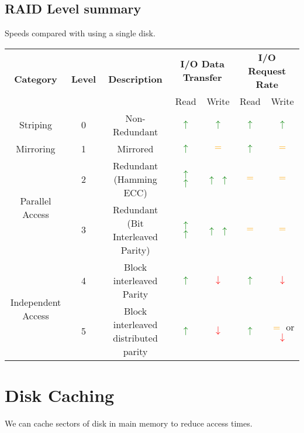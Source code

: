\documentclass{report}
\begin{document}
        \subsection*{RAID Level summary}
            Speeds compared with using a single disk.
            \begin{center}
                \begin{tabular}{c c c c c c c }
                    \multirow{2}{*}{\textbf{Category}} & \multirow{2}{*}{\textbf{Level}} & \multirow{2}{*}{\textbf{Description}} & \multicolumn{2}{c}{\textbf{I/O Data Transfer}} & \multicolumn{2}{c}{\textbf{I/O Request Rate}} \\
                    & & & Read & Write & Read & Write \\
                    \hline
                    Striping & 0 & Non-Redundant & \textcolor{green}{$\uparrow$} & \textcolor{green}{$\uparrow$} & \textcolor{green}{$\uparrow$} & \textcolor{green}{$\uparrow$} \\
                    Mirroring & 1 & Mirrored & \textcolor{green}{$\uparrow$} & \textcolor{orange}{$=$} & \textcolor{green}{$\uparrow$} & \textcolor{orange}{$=$} \\
                    \multirow{2}{*}{Parallel Access} & 2 & Redundant (Hamming ECC) & \textcolor{green}{$\uparrow$} \textcolor{green}{$\uparrow$} & \textcolor{green}{$\uparrow$} \textcolor{green}{$\uparrow$} & \textcolor{orange}{$=$} & \textcolor{orange}{$=$} \\
                    & 3 & Redundant (Bit Interleaved Parity) & \textcolor{green}{$\uparrow$} \textcolor{green}{$\uparrow$} & \textcolor{green}{$\uparrow$} \textcolor{green}{$\uparrow$} & \textcolor{orange}{$=$} & \textcolor{orange}{$=$} \\
                    \multirow{2}{*}{Independent Access} & 4 & Block interleaved Parity & \textcolor{green}{$\uparrow$} & \textcolor{red}{$\downarrow$} & \textcolor{green}{$\uparrow$} & \textcolor{red}{$\downarrow$} \\
                    & 5 & Block interleaved distributed parity & \textcolor{green}{$\uparrow$} & \textcolor{red}{$\downarrow$} & \textcolor{green}{$\uparrow$} & \textcolor{orange}{$=$} or \textcolor{red}{$\downarrow$} \\
                \end{tabular}
            \end{center}
    \section*{Disk Caching}
        We can cache sectors of disk in main memory to reduce access times. 
\end{document}
